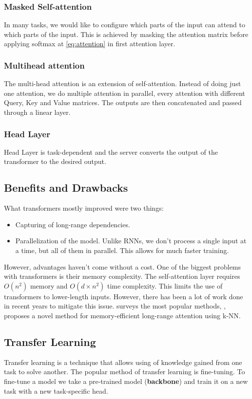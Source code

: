 \subsubsection{Masked Self-attention}
In many tasks, we would like to configure which parts of the input can attend to which parts of the input.
This is achieved by masking the attention matrix before applying softmax at \autoref{eq:attention} in first attention layer.

\subsubsection{Multihead attention}
The multi-head attention is an extension of self-attention.
Instead of doing just one attention, we do multiple attention in parallel, every attention with different Query, Key and Value matrices.
The outputs are then concatenated and passed through a linear layer.

\subsubsection{Head Layer}
Head Layer is task-dependent and the server converts the output of the transformer to the desired output.

\subsection{Benefits and Drawbacks}
\label{sec:benefits-and-drawbacks}
What transformers mostly improved were two things:
\begin{itemize}
    \item Capturing of long-range dependencies.
    \item Parallelization of the model. Unlike RNNs, we don't process a single input at a time,
    but all of them in parallel. This allows for much faster training.
\end{itemize}
However, advantages haven't come without a cost. One of the biggest problems with transformers
is their memory complexity. The self-attention layer requires $O(n^2)$ memory and $O(d \times n^2)$ time complexity.
This limits the use of transformers to lower-length inputs. However, there has been
a lot of work done in recent years to mitigate this issue.
\cite{zhuangSurveyEfficientTraining2023} surveys the most popular methods,
\cite{wuMEMORIZINGTRANSFORMERS2022}, proposes a novel method for memory-efficient long-range attention using k-NN.

\subsection{Transfer Learning}
\label{sec:transfer-learning}
Transfer learning is a technique that allows using of knowledge gained from one task to solve another.
The popular method of transfer learning is fine-tuning. To fine-tune a model we take a pre-trained model (\textbf{backbone})
and train it on a new task with a new task-specific head.

